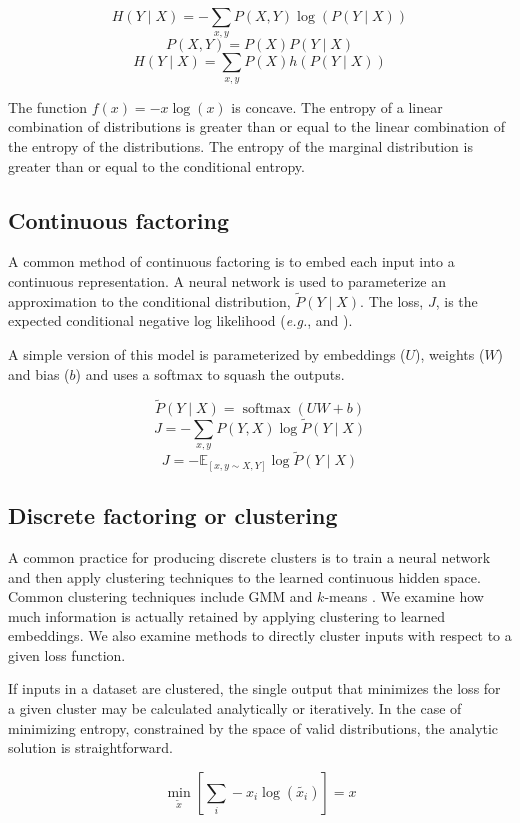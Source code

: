 \documentclass[11pt,letterpaper]{article}
\begin{document}
$$H(Y \mid X)=-\sum_{x,y} P(X, Y) \log(P(Y \mid X)) $$
$$P(X,Y) = P(X) P(Y \mid X)$$
$$H(Y \mid X)= \sum_{x,y}  P(X) h(P(Y \mid X))$$

The function $f(x)=-x \log(x)$ is concave. The entropy of a linear combination of distributions is greater than or equal to the linear combination of the entropy of the distributions. The entropy of the marginal distribution is greater than or equal to the conditional entropy.

\subsection{Continuous factoring}

A common method of continuous factoring is to embed each input into a continuous representation. A neural network is used to parameterize an approximation to the conditional distribution, $\tilde{P}(Y \mid X)$. The loss, $J$, is the expected conditional negative log likelihood (\textit{e.g.}, \cite{MikolovSCCD13} and \cite{Mikolov1301}).

A simple version of this model is parameterized by embeddings ($U$), weights ($W$) and bias ($b$) and uses a softmax to squash the outputs.

$$ \tilde{P}(Y\mid X) = \operatorname{softmax}(U W+b)$$
$$ J = -\sum_{x, y} P(Y,X) \log \tilde{P}(Y \mid X) $$
$$ J = -\mathbb{E}_{[x,y \sim X, Y]} \log \tilde{P}(Y \mid X) $$

\subsection{Discrete factoring or clustering}

A common practice for producing discrete clusters is to train a neural network and then apply clustering techniques to the learned continuous hidden space. Common clustering techniques include GMM and $k$-means \cite{Lloyd:2006:LSQ:2263356.2269955}. We examine how much information is actually retained by applying clustering to learned embeddings. We also examine methods to directly cluster inputs with respect to a given loss function.%

If inputs in a dataset are clustered, the single output that minimizes the loss for a given cluster may be calculated analytically or iteratively. In the case of minimizing entropy, constrained by the space of valid distributions, the analytic solution is straightforward.

$$\min_{\tilde{x}}[\sum_i-x_i \log(\tilde{x_i})] = x$$
\end{document}
